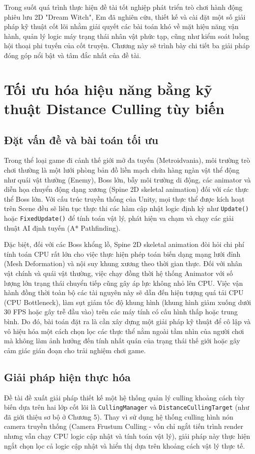 Trong suốt quá trình thực hiện đề tài tốt nghiệp phát triển trò chơi hành động phiêu lưu 2D "Dream Witch", Em đã nghiên cứu, thiết kế và cài đặt một số giải pháp kỹ thuật cốt lõi nhằm giải quyết các bài toán khó về mặt hiệu năng vận hành, quản lý logic máy trạng thái nhân vật phức tạp, cũng như kiểm soát luồng hội thoại phi tuyến của cốt truyện. Chương này sẽ trình bày chi tiết ba giải pháp đóng góp nổi bật và tâm đắc nhất của đề tài.

\section{Tối ưu hóa hiệu năng bằng kỹ thuật Distance Culling tùy biến}

\subsection{Đặt vấn đề và bài toán tối ưu}
Trong thể loại game đi cảnh thế giới mở đa tuyến (Metroidvania), môi trường trò chơi thường là một lưới phòng bản đồ liền mạch chứa hàng ngàn vật thể động như quái vật thường (Enemy), Boss lớn, bẫy môi trường di động, các animator và diễn họa chuyển động dạng xương (Spine 2D skeletal animation) đối với các thực thể Boss lớn. Với cấu trúc truyền thống của Unity, mọi thực thể được kích hoạt trên Scene đều sẽ liên tục thực thi các hàm cập nhật logic định kỳ như \texttt{Update()} hoặc \texttt{FixedUpdate()} để tính toán vật lý, phát hiện va chạm và chạy các giải thuật AI định tuyến (A* Pathfinding). 

Đặc biệt, đối với các Boss khổng lồ, Spine 2D skeletal animation đòi hỏi chi phí tính toán CPU rất lớn cho việc thực hiện phép toán biến dạng mạng lưới đỉnh (Mesh Deformation) và nội suy khung xương theo thời gian thực. Đối với nhân vật chính và quái vật thường, việc chạy đồng thời hệ thống Animator với số lượng lớn trạng thái chuyển tiếp cũng gây áp lực không nhỏ lên CPU. Việc vận hành đồng thời toàn bộ các tài nguyên này sẽ dẫn đến hiện tượng quá tải CPU (CPU Bottleneck), làm sụt giảm tốc độ khung hình (khung hình giảm xuống dưới 30 FPS hoặc gây trễ đầu vào) trên các máy tính có cấu hình thấp hoặc trung bình. Do đó, bài toán đặt ra là cần xây dựng một giải pháp kỹ thuật để cô lập và vô hiệu hóa một cách chọn lọc các thực thể nằm ngoài tầm nhìn của người chơi mà không làm ảnh hưởng đến tính nhất quán của trạng thái thế giới hoặc gây cảm giác gián đoạn cho trải nghiệm chơi game.

\subsection{Giải pháp hiện thực hóa}
Đề tài đề xuất giải pháp thiết kế một hệ thống quản lý culling khoảng cách tùy biến dựa trên hai lớp cốt lõi là \texttt{CullingManager} và \texttt{DistanceCullingTarget} (như đã giới thiệu sơ bộ ở Chương 5). Thay vì sử dụng hệ thống culling hình nón camera truyền thống (Camera Frustum Culling - vốn chỉ ngắt tiến trình render nhưng vẫn chạy CPU logic cập nhật và tính toán vật lý), giải pháp này thực hiện ngắt chọn lọc cả logic cập nhật và hiển thị dựa trên khoảng cách vật lý thực tế.

